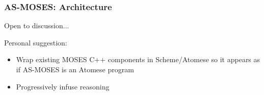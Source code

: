 \documentclass{beamer}
\begin{document}
\begin{frame}
  \frametitle{AS-MOSES: Architecture}

  Open to discussion...\\[0.5cm]

  \pause

  Personal suggestion:
  \begin{itemize}
  \item Wrap existing MOSES C++ components in Scheme/Atomese so it
    appears as if \alert{AS-MOSES is an Atomese program}
  \item Progressively infuse reasoning
  \end{itemize}

\end{frame}
\end{document}
